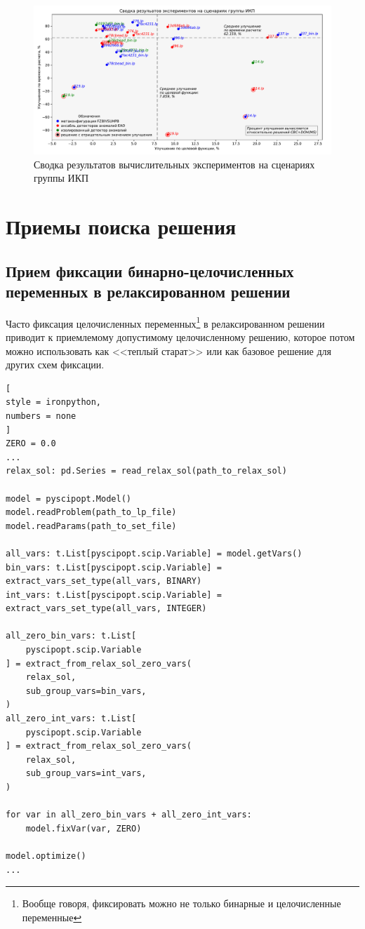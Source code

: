 \documentclass[%
	11pt,
	a4paper,
	utf8,
		]{article}
\begin{document}
\begin{figure}[!h]
	\centering
	\includegraphics[scale=0.57]{figures/summary_FZB_EAD_for_IKP.pdf}
	\caption{ Сводка результатов вычислительных экспериментов на сценариях группы ИКП }\label{fig:summary_FZB_EAD_for_IKP}
\end{figure}









\section{Приемы поиска решения}

\subsection{Прием фиксации бинарно-целочисленных переменных в релаксированном решении}\label{sec:bin_int_relax_fix}

Часто фиксация целочисленных переменных\footnote{Вообще говоря, фиксировать можно не только бинарные и целочисленные переменные} в релаксированном решении приводит к приемлемому допустимому целочисленному решению, которое потом можно использовать как <<теплый старат>> или как базовое решение для других схем фиксации.
\begin{lstlisting}[
style = ironpython,
numbers = none
]
ZERO = 0.0
...
relax_sol: pd.Series = read_relax_sol(path_to_relax_sol)

model = pyscipopt.Model()
model.readProblem(path_to_lp_file)
model.readParams(path_to_set_file)

all_vars: t.List[pyscipopt.scip.Variable] = model.getVars()
bin_vars: t.List[pyscipopt.scip.Variable] = extract_vars_set_type(all_vars, BINARY)
int_vars: t.List[pyscipopt.scip.Variable] = extract_vars_set_type(all_vars, INTEGER)

all_zero_bin_vars: t.List[
	pyscipopt.scip.Variable
] = extract_from_relax_sol_zero_vars(
	relax_sol,
	sub_group_vars=bin_vars,
)
all_zero_int_vars: t.List[
	pyscipopt.scip.Variable
] = extract_from_relax_sol_zero_vars(
	relax_sol,
	sub_group_vars=int_vars,
)

for var in all_zero_bin_vars + all_zero_int_vars:
	model.fixVar(var, ZERO)

model.optimize()
...
\end{lstlisting}
\end{document}
